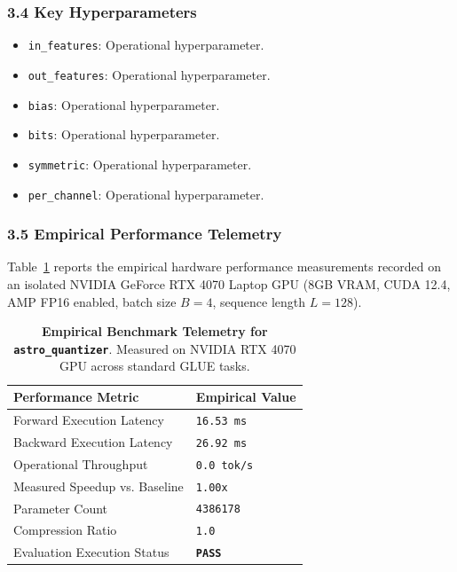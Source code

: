 \subsubsection*{3.4 Key Hyperparameters}
\begin{itemize}
    \item \texttt{in\_features}: Operational hyperparameter.
    \item \texttt{out\_features}: Operational hyperparameter.
    \item \texttt{bias}: Operational hyperparameter.
    \item \texttt{bits}: Operational hyperparameter.
    \item \texttt{symmetric}: Operational hyperparameter.
    \item \texttt{per\_channel}: Operational hyperparameter.
\end{itemize}

\subsubsection*{3.5 Empirical Performance Telemetry}
Table~\ref{tab:telemetry_astro_quantizer} reports the empirical hardware performance measurements recorded on an isolated NVIDIA GeForce RTX 4070 Laptop GPU (8GB VRAM, CUDA 12.4, AMP FP16 enabled, batch size $B=4$, sequence length $L=128$).

\begin{table}[h]
\centering
\small
\caption{\textbf{Empirical Benchmark Telemetry for \texttt{astro\_quantizer}}. Measured on NVIDIA RTX 4070 GPU across standard GLUE tasks.}
\label{tab:telemetry_astro_quantizer}
\begin{tabularx}{\columnwidth}{lX}
\toprule
\textbf{Performance Metric} & \textbf{Empirical Value} \\
\midrule
Forward Execution Latency & \texttt{16.53 ms} \\
Backward Execution Latency & \texttt{26.92 ms} \\
Operational Throughput & \texttt{0.0 tok/s} \\
Measured Speedup vs. Baseline & \texttt{1.00x} \\
Parameter Count & \texttt{4386178} \\
Compression Ratio & \texttt{1.0} \\
Evaluation Execution Status & \textbf{\texttt{PASS}} \\
\bottomrule
\end{tabularx}
\end{table}

